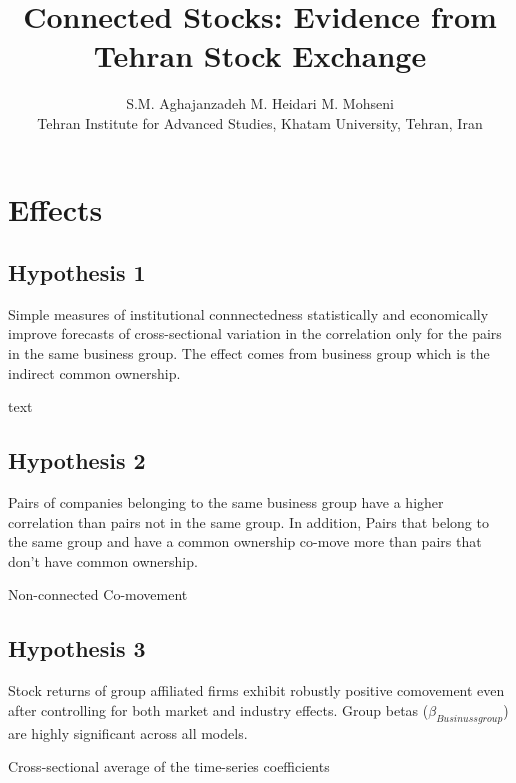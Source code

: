 \documentclass[12pt, a4paper]{article}
\title{Connected Stocks: Evidence from Tehran Stock Exchange}
\author{S.M. Aghajanzadeh\sym{*} \qquad M. Heidari\sym{*} \qquad M. Mohseni\sym{*} \\
	\sym{*} \footnotesize  Tehran Institute for Advanced Studies, Khatam University, Tehran, Iran
}
\begin{document}
	\maketitle
\section*{Effects}
\subsection*{\textbf{Hypothesis 1}}
 Simple measures of institutional connnectedness statistically and economically improve forecasts of cross-sectional variation in the correlation only for the pairs in the same business group. The effect comes from business group which is the indirect common ownership.

		\begin{table}[htbp]
	\centering
	\caption{text}
	\resizebox{\textwidth}{!}{
		
	}
\end{table}

	\FloatBarrier
	\newpage
	
\subsection*{\textbf{Hypothesis 2}}
 Pairs of companies belonging to the same business group have a higher correlation than pairs not in the same group. In addition, Pairs that belong to the same group and have a common ownership co-move more than pairs that don't have common ownership. 
 
\begin{landscape}
	\begin{table}[htbp]
		\caption{Non-connected Co-movement}
		\label{AllPairs}
		\resizebox{1.7\textwidth}{!}{
			
		}
	\end{table}
\end{landscape}

\newpage
\subsection*{\textbf{Hypothesis 3}} 
Stock returns of group affiliated firms exhibit robustly positive comovement even after controlling for both market and industry effects. Group betas
($ \beta_{Businussgroup} $) are highly significant across all models.



			\begin{table}[htbp]
		\centering
		\caption{Cross-sectional average of the time-series coefficients}
		\resizebox{\textwidth}{!}{
			
			
		
		}
	\end{table}
\end{document}
